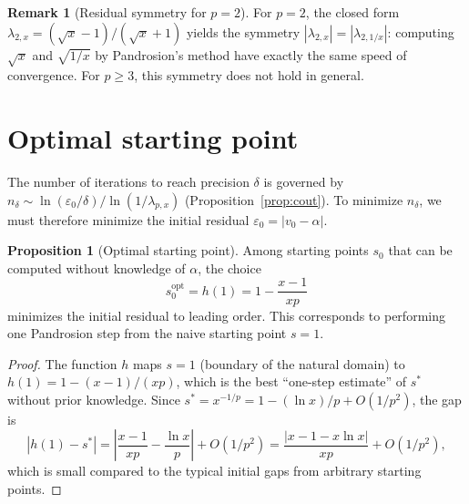 \documentclass[11pt,a4paper]{article}
\theoremstyle{definition}
\newtheorem{proposition}{Proposition}[section]
\newtheorem{remark}{Remark}[section]
\newcommand{\eps}{\varepsilon}
\begin{document}
\begin{remark}[Residual symmetry for $p=2$]
For $p = 2$, the closed form $\lambda_{2,x} = (\sqrt{x}-1)/(\sqrt{x}+1)$ yields the symmetry $|\lambda_{2,x}| = |\lambda_{2,1/x}|$: computing $\sqrt{x}$ and $\sqrt{1/x}$ by Pandrosion's method have exactly the same speed of convergence. For $p \geq 3$, this symmetry does not hold in general.
\end{remark}

\section{Optimal starting point}
\label{sec:optimal_start}

The number of iterations to reach precision $\delta$ is governed by $n_\delta \sim \ln(\eps_0/\delta) / \ln(1/\lambda_{p,x})$ (Proposition~\ref{prop:cout}). To minimize $n_\delta$, we must therefore minimize the initial residual $\eps_0 = |v_0 - \alpha|$.

\begin{proposition}[Optimal starting point]
\label{prop:optimal_start}
Among starting points $s_0$ that can be computed without knowledge of $\alpha$, the choice
\begin{equation}
  \label{eq:optimal_s0}
  s_0^{\mathrm{opt}} = h(1) = 1 - \frac{x-1}{xp}
\end{equation}
minimizes the initial residual to leading order. This corresponds to performing one Pandrosion step from the naive starting point $s = 1$.
\end{proposition}

\begin{proof}
The function $h$ maps $s = 1$ (boundary of the natural domain) to $h(1) = 1 - (x-1)/(xp)$, which is the best ``one-step estimate'' of $s^*$ without prior knowledge. Since $s^* = x^{-1/p} = 1 - (\ln x)/p + O(1/p^2)$, the gap is
\[
  |h(1) - s^*| = \left|\frac{x-1}{xp} - \frac{\ln x}{p}\right| + O(1/p^2) = \frac{|x - 1 - x\ln x|}{xp} + O(1/p^2),
\]
which is small compared to the typical initial gaps from arbitrary starting points.
\end{proof}
\end{document}
